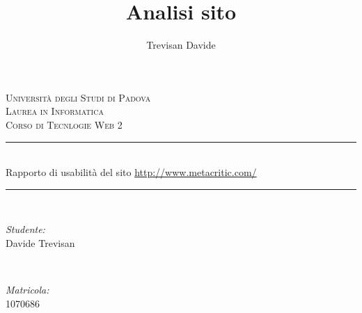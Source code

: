 \documentclass[12pt]{article}
\title{Analisi sito}
\date{}
\author{Trevisan Davide}
\begin{document}



\begin{titlepage}

\newcommand{\HRule}{\rule{\linewidth}{0.5mm}} %

\center %
 

\textsc{\LARGE Università degli Studi di Padova}\\[1.5cm] %
\textsc{\Large Laurea in Informatica}\\[0.5cm] %
\textsc{\large Corso di Tecnlogie Web 2}\\[0.5cm] %


\HRule \\[0.4cm]
{ \huge  Rapporto di usabilità del sito \url{http://www.metacritic.com/}}\\[0.3cm] %
\HRule \\[1.5cm]
 

\begin{minipage}{0.4\textwidth}
\begin{flushleft} \large
\emph{Studente:}\\
Davide Trevisan %
\end{flushleft}
\end{minipage}
~
\begin{minipage}{0.4\textwidth}
\begin{flushright} \large
\emph{Matricola:} \\
\textsc{1070686} %
\end{flushright}
\end{minipage}\\[1cm]


\end{titlepage}
\end{document}
